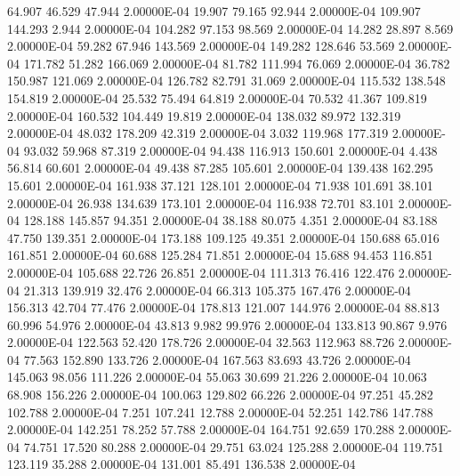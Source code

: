     64.907    46.529    47.944  2.00000E-04
    19.907    79.165    92.944  2.00000E-04
   109.907   144.293     2.944  2.00000E-04
   104.282    97.153    98.569  2.00000E-04
    14.282    28.897     8.569  2.00000E-04
    59.282    67.946   143.569  2.00000E-04
   149.282   128.646    53.569  2.00000E-04
   171.782    51.282   166.069  2.00000E-04
    81.782   111.994    76.069  2.00000E-04
    36.782   150.987   121.069  2.00000E-04
   126.782    82.791    31.069  2.00000E-04
   115.532   138.548   154.819  2.00000E-04
    25.532    75.494    64.819  2.00000E-04
    70.532    41.367   109.819  2.00000E-04
   160.532   104.449    19.819  2.00000E-04
   138.032    89.972   132.319  2.00000E-04
    48.032   178.209    42.319  2.00000E-04
     3.032   119.968   177.319  2.00000E-04
    93.032    59.968    87.319  2.00000E-04
    94.438   116.913   150.601  2.00000E-04
     4.438    56.814    60.601  2.00000E-04
    49.438    87.285   105.601  2.00000E-04
   139.438   162.295    15.601  2.00000E-04
   161.938    37.121   128.101  2.00000E-04
    71.938   101.691    38.101  2.00000E-04
    26.938   134.639   173.101  2.00000E-04
   116.938    72.701    83.101  2.00000E-04
   128.188   145.857    94.351  2.00000E-04
    38.188    80.075     4.351  2.00000E-04
    83.188    47.750   139.351  2.00000E-04
   173.188   109.125    49.351  2.00000E-04
   150.688    65.016   161.851  2.00000E-04
    60.688   125.284    71.851  2.00000E-04
    15.688    94.453   116.851  2.00000E-04
   105.688    22.726    26.851  2.00000E-04
   111.313    76.416   122.476  2.00000E-04
    21.313   139.919    32.476  2.00000E-04
    66.313   105.375   167.476  2.00000E-04
   156.313    42.704    77.476  2.00000E-04
   178.813   121.007   144.976  2.00000E-04
    88.813    60.996    54.976  2.00000E-04
    43.813     9.982    99.976  2.00000E-04
   133.813    90.867     9.976  2.00000E-04
   122.563    52.420   178.726  2.00000E-04
    32.563   112.963    88.726  2.00000E-04
    77.563   152.890   133.726  2.00000E-04
   167.563    83.693    43.726  2.00000E-04
   145.063    98.056   111.226  2.00000E-04
    55.063    30.699    21.226  2.00000E-04
    10.063    68.908   156.226  2.00000E-04
   100.063   129.802    66.226  2.00000E-04
    97.251    45.282   102.788  2.00000E-04
     7.251   107.241    12.788  2.00000E-04
    52.251   142.786   147.788  2.00000E-04
   142.251    78.252    57.788  2.00000E-04
   164.751    92.659   170.288  2.00000E-04
    74.751    17.520    80.288  2.00000E-04
    29.751    63.024   125.288  2.00000E-04
   119.751   123.119    35.288  2.00000E-04
   131.001    85.491   136.538  2.00000E-04
